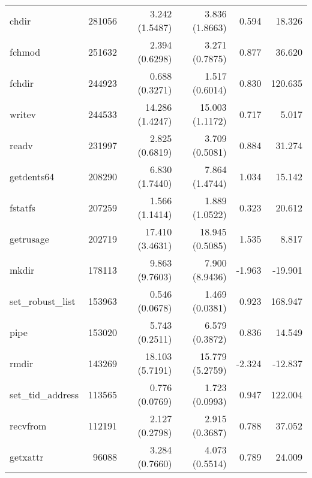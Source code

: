 \begin{longtable}{>{\ttfamily}lrrrrr}
                          chdir &     281056 &              3.242 (1.5487) &            3.836 (1.8663) &           0.594 &       18.326 \\
                         fchmod &     251632 &              2.394 (0.6298) &            3.271 (0.7875) &           0.877 &       36.620 \\
                         fchdir &     244923 &              0.688 (0.3271) &            1.517 (0.6014) &           0.830 &      120.635 \\
                         writev &     244533 &             14.286 (1.4247) &           15.003 (1.1172) &           0.717 &        5.017 \\
                          readv &     231997 &              2.825 (0.6819) &            3.709 (0.5081) &           0.884 &       31.274 \\
                     getdents64 &     208290 &              6.830 (1.7440) &            7.864 (1.4744) &           1.034 &       15.142 \\
                        fstatfs &     207259 &              1.566 (1.1414) &            1.889 (1.0522) &           0.323 &       20.612 \\
                      getrusage &     202719 &             17.410 (3.4631) &           18.945 (0.5085) &           1.535 &        8.817 \\
                          mkdir &     178113 &              9.863 (9.7603) &            7.900 (8.9436) &          -1.963 &      -19.901 \\
              set\_robust\_list &     153963 &              0.546 (0.0678) &            1.469 (0.0381) &           0.923 &      168.947 \\
                           pipe &     153020 &              5.743 (0.2511) &            6.579 (0.3872) &           0.836 &       14.549 \\
                          rmdir &     143269 &             18.103 (5.7191) &           15.779 (5.2759) &          -2.324 &      -12.837 \\
              set\_tid\_address &     113565 &              0.776 (0.0769) &            1.723 (0.0993) &           0.947 &      122.004 \\
                       recvfrom &     112191 &              2.127 (0.2798) &            2.915 (0.3687) &           0.788 &       37.052 \\
                       getxattr &      96088 &              3.284 (0.7660) &            4.073 (0.5514) &           0.789 &       24.009 \\

\end{longtable}
